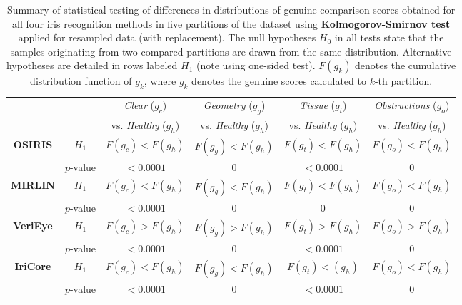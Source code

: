 \documentclass[article,12pt]{elsarticle}
\newcommand{\textapprox}{\raisebox{0.5ex}{\texttildelow}}
\begin{document}
\begin{table}[!htb]
\renewcommand{\arraystretch}{1.1}
\caption{Summary of statistical testing of differences in distributions of genuine comparison scores obtained for all four iris recognition methods in five partitions of the dataset using \textbf{Kolmogorov-Smirnov test} applied for resampled data (with replacement). The null hypotheses $H_0$ in all tests state that the samples originating from two compared partitions are drawn from the same distribution. Alternative hypotheses are detailed in rows labeled $H_1$ (note using one-sided test). $F(g_k)$ denotes the cumulative distribution function of $g_k$, where $g_k$ denotes the genuine scores calculated to $k$-th partition.}
\label{table:statTestsGenuine}
\centering\scriptsize
\begin{tabular}[t]{cc|c|c|c|c|}
\cline{3-6}
& & \emph{Clear} ($g_c$) & \emph{Geometry} ($g_g$) & \emph{Tissue} ($g_t$) & \emph{Obstructions} ($g_o$) \\
& & vs. \emph{Healthy} ($g_h$) & vs. \emph{Healthy} ($g_h$) & vs. \emph{Healthy} ($g_h$) & vs. \emph{Healthy} ($g_h$) \\\hline\hline
\multicolumn{1}{|c}{\multirow{2}{*}{\bf OSIRIS}} & \multicolumn{1}{|c|}{$H_1$} & $F(g_c) < F(g_h)$ & $F(g_g) < F(g_h)$ & $F(g_t) < F(g_h)$ & $F(g_o) < F(g_h)$  \\\cline{2-6}
\multicolumn{1}{|c}{} & \multicolumn{1}{|c|}{$p$-value} & $< 0.0001$  & \textapprox 0 & $< 0.0001$  & \textapprox 0 \\\hline
\multicolumn{1}{|c}{\multirow{2}{*}{\bf MIRLIN}} & \multicolumn{1}{|c|}{$H_1$} & $F(g_c) < F(g_h)$ & $F(g_g) < F(g_h)$ & $F(g_t)<F(g_h)$ & $F(g_o)<F(g_h)$  \\\cline{2-6}
\multicolumn{1}{|c}{} & \multicolumn{1}{|c|}{$p$-value} & $< 0.0001$  & \textapprox 0 & \textapprox 0 & \textapprox 0 \\\hline
\multicolumn{1}{|c}{\multirow{2}{*}{\bf VeriEye}} & \multicolumn{1}{|c|}{$H_1$} & $F(g_c) > F(g_h)$ & $F(g_g) > F(g_h)$ & $F(g_t) > F(g_h)$ & $F(g_o) > F(g_h)$  \\\cline{2-6}
\multicolumn{1}{|c}{} & \multicolumn{1}{|c|}{$p$-value} & $< 0.0001$ & \textapprox 0 & $< 0.0001$ & \textapprox 0 \\\hline
\multicolumn{1}{|c}{\multirow{2}{*}{\bf IriCore}} & \multicolumn{1}{|c|}{$H_1$} & $F(g_c) < F(g_h)$ & $F(g_g) < F(g_h)$ & $F(g_t)<(g_h)$ & $F(g_o)<F(g_h)$  \\\cline{2-6}
\multicolumn{1}{|c}{} & \multicolumn{1}{|c|}{$p$-value} & $< 0.0001$ & \textapprox 0 & $< 0.0001$ & \textapprox 0 \\\hline
\end{tabular}
\end{table}
\end{document}
